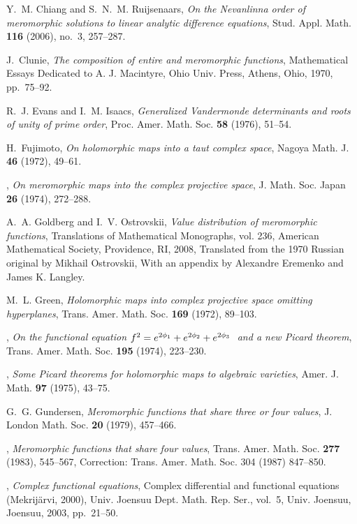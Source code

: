 \documentclass{amsart}
\theoremstyle{definition}
\numberwithin{equation}{section}
\numberwithin{theorem}{section}
\begin{document}
\begin{thebibliography}{10}
Y.~M. Chiang and S.~N.~M. Ruijsenaars, \emph{On the {N}evanlinna order of
  meromorphic solutions to linear analytic difference equations}, Stud. Appl.
  Math. \textbf{116} (2006), no.~3, 257--287.

J.~Clunie, \emph{The composition of entire and meromorphic functions},
  Mathematical {E}ssays {D}edicated to {A}. {J}. {M}acintyre, Ohio Univ. Press,
  Athens, Ohio, 1970, pp.~75--92.

R.~J. Evans and I.~M. Isaacs, \emph{Generalized {V}andermonde determinants and
  roots of unity of prime order}, Proc. Amer. Math. Soc. \textbf{58} (1976),
  51--54.

H.~Fujimoto, \emph{On holomorphic maps into a taut complex space}, Nagoya Math.
  J. \textbf{46} (1972), 49--61.

\bysame, \emph{On meromorphic maps into the complex projective space}, J. Math.
  Soc. Japan \textbf{26} (1974), 272--288.

A.~A. Goldberg and I.~V. Ostrovskii, \emph{Value distribution of meromorphic
  functions}, Translations of Mathematical Monographs, vol. 236, American
  Mathematical Society, Providence, RI, 2008, Translated from the 1970 Russian
  original by Mikhail Ostrovskii, With an appendix by Alexandre Eremenko and
  James K. Langley.

M.~L. Green, \emph{Holomorphic maps into complex projective space omitting
  hyperplanes}, Trans. Amer. Math. Soc. \textbf{169} (1972), 89--103.

\bysame, \emph{On the functional equation
  {$f\sp{2}=e\sp{2\phi\sb{1}}+e\sp{2\phi\sb{2}}+e\sp{2\phi\sb{3}}\ $} and a new
  {P}icard theorem}, Trans. Amer. Math. Soc. \textbf{195} (1974), 223--230.

\bysame, \emph{Some {P}icard theorems for holomorphic maps to algebraic
  varieties}, Amer. J. Math. \textbf{97} (1975), 43--75.

G.~G. Gundersen, \emph{Meromorphic functions that share three or four values},
  J. London Math. Soc. \textbf{20} (1979), 457--466.

\bysame, \emph{Meromorphic functions that share four values}, Trans. Amer.
  Math. Soc. \textbf{277} (1983), 545--567, Correction: Trans. Amer. Math. Soc.
  304 (1987) 847--850.

\bysame, \emph{Complex functional equations}, Complex differential and
  functional equations ({M}ekrij\"arvi, 2000), Univ. Joensuu Dept. Math. Rep.
  Ser., vol.~5, Univ. Joensuu, Joensuu, 2003, pp.~21--50.


\end{thebibliography}
\end{document}
